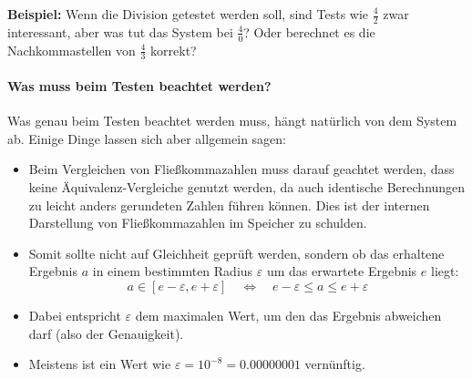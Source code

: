 	\textbf{Beispiel:} Wenn die Division getestet werden soll, sind Tests wie \(\frac{4}{2}\) zwar interessant, aber was tut das System bei \(\frac{4}{0}\)? Oder berechnet es die Nachkommastellen von \(\frac{4}{3}\) korrekt?

\paragraph{Was muss beim Testen beachtet werden?}
	Was genau beim Testen beachtet werden muss, hängt natürlich von dem System ab. Einige Dinge lassen sich aber allgemein sagen:
	\begin{itemize}
		\item Beim Vergleichen von Fließkommazahlen muss darauf geachtet werden, dass keine Äquivalenz-Vergleiche genutzt werden, da auch identische Berechnungen zu leicht anders gerundeten Zahlen führen können. Dies ist der internen Darstellung von Fließkommazahlen im Speicher zu schulden.
		\item Somit sollte nicht auf Gleichheit geprüft werden, sondern ob das erhaltene Ergebnis \(a\) in einem bestimmten Radius \(\varepsilon\) um das erwartete Ergebnis \(e\) liegt:
			\begin{equation*}
				a \in [e - \varepsilon, e + \varepsilon] \quad\iff\quad e - \varepsilon \leq a \leq e + \varepsilon
			\end{equation*}
		\item Dabei entspricht \(\varepsilon\) dem maximalen Wert, um den das Ergebnis abweichen darf (also der Genauigkeit).
		\item Meistens ist ein Wert wie \( \varepsilon = 10^{-8} = 0.00000001 \) vernünftig.
	\end{itemize}
